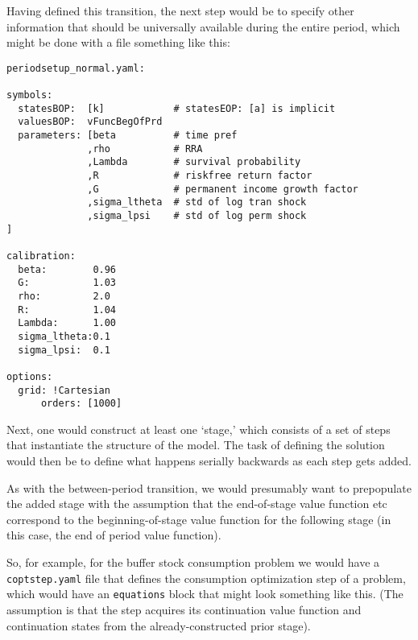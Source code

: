 \documentclass[SolvingMicroDSOPs]{subfiles}
\begin{document}
Having defined this transition, the next step would be to specify other information that should be universally available during the entire period, which might be done with a file something like this:
\begin{verbatim}
periodsetup_normal.yaml:

symbols:
  statesBOP:  [k]            # statesEOP: [a] is implicit
  valuesBOP:  vFuncBegOfPrd
  parameters: [beta          # time pref
              ,rho           # RRA
              ,Lambda        # survival probability
              ,R             # riskfree return factor
              ,G             # permanent income growth factor 
              ,sigma_ltheta  # std of log tran shock
              ,sigma_lpsi    # std of log perm shock 
]

calibration:
  beta:        0.96
  G:           1.03
  rho:         2.0
  R:           1.04
  Lambda:      1.00
  sigma_ltheta:0.1
  sigma_lpsi:  0.1

options:
  grid: !Cartesian
      orders: [1000]
\end{verbatim}

Next, one would construct at least one `stage,' which consists of a set of steps that instantiate the structure of the model.  The task of defining the solution would then be to define what happens serially backwards as each step gets added.

As with the between-period transition, we would presumably want to prepopulate the added stage with the assumption that the end-of-stage value function etc correspond to the beginning-of-stage value function for the following stage (in this case, the end of period value function).

So, for example, for the buffer stock consumption problem we would have a \texttt{coptstep.yaml} file that defines the consumption optimization step of a problem, which would have an \texttt{equations} block that might look something like this.  (The assumption is that the step acquires its continuation value function and continuation states from the already-constructed prior stage).
\end{document}
